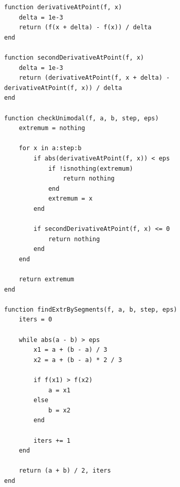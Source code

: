 \documentclass[a4paper, 14pt]{extarticle}
\begin{document}
\begin{figure}[!htb]
\begin{lstlisting}[language={},caption={Нахождение минимумов функции},label={lst:code1}]
function derivativeAtPoint(f, x)
    delta = 1e-3
    return (f(x + delta) - f(x)) / delta
end

function secondDerivativeAtPoint(f, x)
    delta = 1e-3
    return (derivativeAtPoint(f, x + delta) - derivativeAtPoint(f, x)) / delta
end

function checkUnimodal(f, a, b, step, eps)
    extremum = nothing

    for x in a:step:b
        if abs(derivativeAtPoint(f, x)) < eps
            if !isnothing(extremum)
                return nothing
            end
            extremum = x
        end

        if secondDerivativeAtPoint(f, x) <= 0
            return nothing
        end
    end

    return extremum
end

function findExtrBySegments(f, a, b, step, eps)
    iters = 0

    while abs(a - b) > eps
        x1 = a + (b - a) / 3
        x2 = a + (b - a) * 2 / 3

        if f(x1) > f(x2)
            a = x1
        else
            b = x2
        end

        iters += 1
    end

    return (a + b) / 2, iters
end
\end{lstlisting}
\end{figure}
\end{document}
